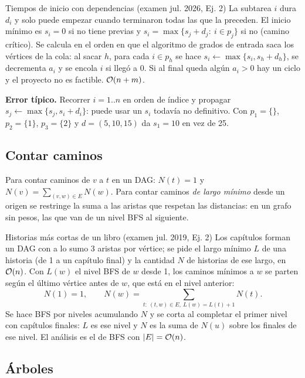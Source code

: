 \begin{problema}{Tiempos de inicio con dependencias (examen jul. 2026, Ej. 2)}
La subtarea $i$ dura $d_i$ y solo puede empezar cuando terminaron todas las
que la preceden. El inicio mínimo es $s_i=0$ si no tiene previas y
$s_i=\max\{s_j+d_j:\ i\in p_j\}$ si no (camino crítico). Se calcula en el
orden en que el algoritmo de grados de entrada saca los vértices de la cola:
al sacar $h$, para cada $i\in p_h$ se hace $s_i\gets\max\{s_i,s_h+d_h\}$, se
decrementa $a_i$ y se encola $i$ si llegó a 0. Si al final queda algún
$a_i>0$ hay un ciclo y el proyecto no es factible. $\mathcal{O}(n+m)$.

\textbf{Error típico.} Recorrer $i=1..n$ en orden de índice y propagar
$s_j\gets\max\{s_j,s_i+d_i\}$: puede usar un $s_i$ todavía no definitivo.
Con $p_1=\{\}$, $p_2=\{1\}$, $p_3=\{2\}$ y $d=(5,10,15)$ da $s_1=10$ en vez
de 25.
\end{problema}

\subsection{Contar caminos}

Para contar caminos de $v$ a $t$ en un DAG: $N(t)=1$ y
$N(v)=\sum_{(v,w)\in E}N(w)$. Para contar caminos \emph{de largo mínimo}
desde un origen se restringe la suma a las aristas que respetan las
distancias: en un grafo sin pesos, las que van de un nivel BFS al
siguiente.

\begin{problema}{Historias más cortas de un libro (examen jul. 2019, Ej. 2)}
Los capítulos forman un DAG con a lo sumo 3 aristas por vértice; se pide el
largo mínimo $L$ de una historia (de 1 a un capítulo final) y la cantidad
$N$ de historias de ese largo, en $\mathcal{O}(n)$. Con $L(w)$ el nivel BFS de $w$
desde 1, los caminos mínimos a $w$ se parten según el último vértice antes
de $w$, que está en el nivel anterior:
\[
N(1)=1,\qquad N(w)=\sum_{t:\ (t,w)\in E,\ L(w)=L(t)+1}N(t).
\]
Se hace BFS por niveles acumulando $N$ y se corta al completar el primer
nivel con capítulos finales: $L$ es ese nivel y $N$ es la suma de $N(u)$
sobre los finales de ese nivel. El análisis es el de BFS con $|E|=\mathcal{O}(n)$.
\end{problema}

\subsection{Árboles}

